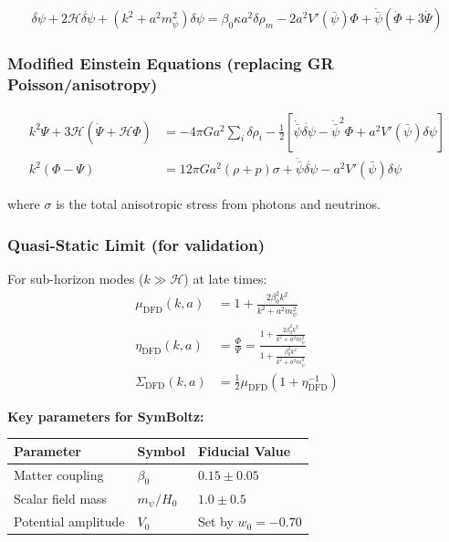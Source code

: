 \documentclass[11pt,a4paper]{article}
\begin{document}
\begin{equation}
\ddot{\delta\psi} + 2\mathcal{H}\dot{\delta\psi} + (k^2 + a^2 m_\psi^2)\delta\psi = \beta_0 \kappa a^2 \delta\rho_m - 2a^2 V'(\bar\psi)\Phi + \dot{\bar\psi}(\dot\Phi + 3\dot\Psi) \label{eq:pertKG}
\end{equation}

\subsubsection{Modified Einstein Equations (replacing GR Poisson/anisotropy)}

\begin{align}
k^2\Psi + 3\mathcal{H}(\dot\Psi + \mathcal{H}\Phi) &= -4\pi G a^2 \sum_i \delta\rho_i - \frac{1}{2}\left[\dot{\bar\psi}\dot{\delta\psi} - \dot{\bar\psi}^2\Phi + a^2 V'(\bar\psi)\delta\psi\right] \label{eq:00} \\
k^2(\Phi - \Psi) &= 12\pi G a^2 (\rho + p)\sigma + \dot{\bar\psi}\dot{\delta\psi} - a^2 V'(\bar\psi)\delta\psi \label{eq:aniso}
\end{align}

where $\sigma$ is the total anisotropic stress from photons and neutrinos.

\subsubsection{Quasi-Static Limit (for validation)}

For sub-horizon modes ($k \gg \mathcal{H}$) at late times:
\begin{align}
\mu_\mathrm{DFD}(k,a) &= 1 + \frac{2\beta_0^2 k^2}{k^2 + a^2 m_\psi^2} \\
\eta_\mathrm{DFD}(k,a) &= \frac{\Phi}{\Psi} = \frac{1 + \frac{2\beta_0^2 k^2}{k^2 + a^2 m_\psi^2}}{1 + \frac{\beta_0^2 k^2}{k^2 + a^2 m_\psi^2}} \\
\Sigma_\mathrm{DFD}(k,a) &= \frac{1}{2}\mu_\mathrm{DFD}(1 + \eta_\mathrm{DFD}^{-1})
\end{align}

\textbf{Key parameters for SymBoltz:}
\begin{center}
\begin{tabular}{lll}
\toprule
\textbf{Parameter} & \textbf{Symbol} & \textbf{Fiducial Value} \\
\midrule
Matter coupling & $\beta_0$ & $0.15 \pm 0.05$ \\
Scalar field mass & $m_\psi / H_0$ & $1.0 \pm 0.5$ \\
Potential amplitude & $V_0$ & Set by $w_0 = -0.70$ \\
\bottomrule
\end{tabular}
\end{center}
\end{document}

